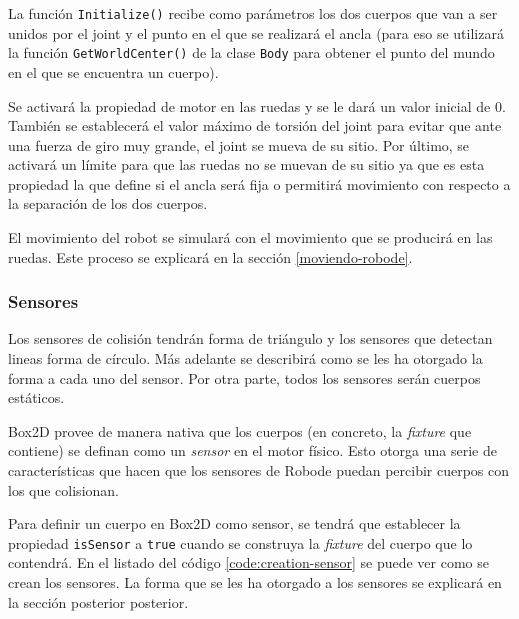 La función \texttt{Initialize()} recibe como parámetros los dos cuerpos que van a ser unidos por el joint y el punto en el que se realizará el ancla (para eso se utilizará la función \texttt{GetWorldCenter()} de la clase \texttt{Body} para obtener el punto del mundo en el que se encuentra un cuerpo).

Se activará la propiedad de motor en las ruedas y se le dará un valor inicial de 0. También se establecerá el valor máximo de torsión del joint para evitar que ante una fuerza de giro muy grande, el joint se mueva de su sitio. Por último, se activará un límite para que las ruedas no se muevan de su sitio ya que es esta propiedad la que define si el ancla será fija o permitirá movimiento con respecto a la separación de los dos cuerpos.

El movimiento del robot se simulará con el movimiento que se producirá en las ruedas. Este proceso se explicará en la sección \ref{moviendo-robode}.

\subsubsection*{Sensores}

Los sensores de colisión tendrán forma de triángulo y los sensores que detectan lineas forma de círculo. Más adelante se describirá como se les ha otorgado la forma a cada uno del sensor. Por otra parte, todos los sensores serán cuerpos estáticos.

Box2D provee de manera nativa que los cuerpos (en concreto, la \emph{fixture} que contiene) se definan como un \emph{sensor} en el motor físico. Esto otorga una serie de características que hacen que los sensores de Robode puedan percibir cuerpos con los que colisionan. 

Para definir un cuerpo en Box2D como sensor, se tendrá que establecer la propiedad \texttt{isSensor} a \texttt{true} cuando se construya la \emph{fixture} del cuerpo que lo contendrá. En el listado del código \ref{code:creation-sensor} se puede ver como se crean los sensores. La forma que se les ha otorgado a los sensores se explicará en la sección posterior posterior.

